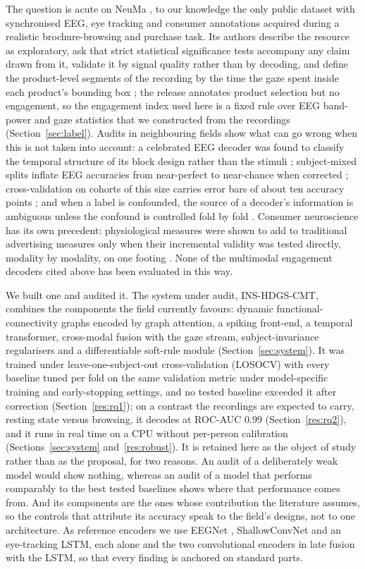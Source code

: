 \documentclass[pdflatex,sn-basic,Numbered,twocolumn,iicol]{sn-jnl}
\theoremstyle{thmstyleone}%
\theoremstyle{thmstyletwo}%
\theoremstyle{thmstylethree}%
\begin{document}
The question is acute on NeuMa \cite{ref35}, to our knowledge the only public dataset with synchronised EEG, eye tracking and consumer annotations acquired during a realistic brochure-browsing and purchase task. Its authors describe the resource as exploratory, ask that strict statistical significance tests accompany any claim drawn from it, validate it by signal quality rather than by decoding, and define the product-level segments of the recording by the time the gaze spent inside each product's bounding box \cite{ref35}; the release annotates product selection but no engagement, so the engagement index used here is a fixed rule over EEG band-power and gaze statistics that we constructed from the recordings (Section~\ref{sec:label}). Audits in neighbouring fields show what can go wrong when this is not taken into account: a celebrated EEG decoder was found to classify the temporal structure of its block design rather than the stimuli \cite{ref61}; subject-mixed splits inflate EEG accuracies from near-perfect to near-chance when corrected \cite{ref62,ref28,ref29,ref30,ref31,ref32}; cross-validation on cohorts of this size carries error bars of about ten accuracy points \cite{ref63}; and when a label is confounded, the source of a decoder's information is ambiguous unless the confound is controlled fold by fold \cite{ref64}. Consumer neuroscience has its own precedent: physiological measures were shown to add to traditional advertising measures only when their incremental validity was tested directly, modality by modality, on one footing \cite{ref65}. None of the multimodal engagement decoders cited above has been evaluated in this way.

We built one and audited it. The system under audit, INS-HDGS-CMT, combines the components the field currently favours: dynamic functional-connectivity graphs encoded by graph attention, a spiking front-end, a temporal transformer, cross-modal fusion with the gaze stream, subject-invariance regularisers and a differentiable soft-rule module (Section~\ref{sec:system}). It was trained under leave-one-subject-out cross-validation (LOSOCV) with every baseline tuned per fold on the same validation metric under model-specific training and early-stopping settings, and no tested baseline exceeded it after correction (Section~\ref{res:rq1}); on a contrast the recordings are expected to carry, resting state versus browsing, it decodes at ROC-AUC 0.99 (Section~\ref{res:rq2}), and it runs in real time on a CPU without per-person calibration (Sections~\ref{sec:system} and~\ref{res:robust}). It is retained here as the object of study rather than as the proposal, for two reasons. An audit of a deliberately weak model would show nothing, whereas an audit of a model that performs comparably to the best tested baselines shows where that performance comes from. And its components are the ones whose contribution the literature assumes, so the controls that attribute its accuracy speak to the field's designs, not to one architecture. As reference encoders we use EEGNet \cite{ref50}, ShallowConvNet \cite{ref51} and an eye-tracking LSTM, each alone and the two convolutional encoders in late fusion with the LSTM, so that every finding is anchored on standard parts.
\end{document}
